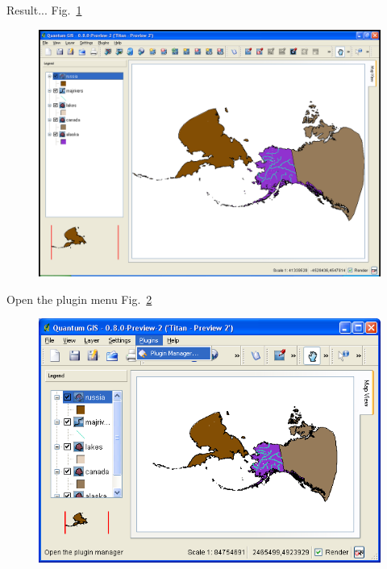 Result... Fig.~\ref{fig:qgis007}

\begin{figure}[htbp]
   \centering
   \includegraphics[scale=0.2]{qgis007.png}
   \caption{}
   \label{fig:qgis007}
\end{figure}

Open the plugin menu Fig.~\ref{fig:qgis008}

\begin{figure}[htbp]
   \centering
   \includegraphics[scale=0.35]{qgis008.png}
   \caption{}
   \label{fig:qgis008}
\end{figure}

